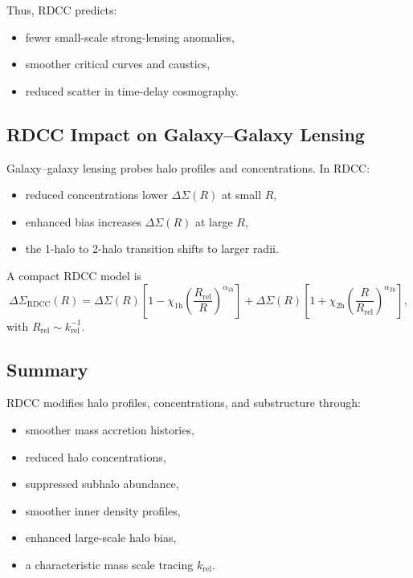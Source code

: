\documentclass[11pt,a4paper]{article}
\begin{document}
Thus, RDCC predicts:
\begin{itemize}
\item fewer small-scale strong-lensing anomalies,
\item smoother critical curves and caustics,
\item reduced scatter in time-delay cosmography.
\end{itemize}

\subsection{RDCC Impact on Galaxy–Galaxy Lensing}

Galaxy–galaxy lensing probes halo profiles and concentrations.  
In RDCC:
\begin{itemize}
\item reduced concentrations lower $\Delta\Sigma(R)$ at small $R$,
\item enhanced bias increases $\Delta\Sigma(R)$ at large $R$,
\item the 1-halo to 2-halo transition shifts to larger radii.
\end{itemize}

A compact RDCC model is
\begin{equation}
\Delta\Sigma_{\mathrm{RDCC}}(R)
=
\Delta\Sigma(R)
\left[
1
-
\chi_{1\mathrm{h}}
\left(
\frac{R_{\mathrm{rel}}}{R}
\right)^{\alpha_{1\mathrm{h}}}
\right]
+
\Delta\Sigma(R)
\left[
1
+
\chi_{2\mathrm{h}}
\left(
\frac{R}{R_{\mathrm{rel}}}
\right)^{\alpha_{2\mathrm{h}}}
\right],
\end{equation}
with $R_{\mathrm{rel}} \sim k_{\mathrm{rel}}^{-1}$.

\subsection{Summary}

RDCC modifies halo profiles, concentrations, and substructure through:
\begin{itemize}
\item smoother mass accretion histories,
\item reduced halo concentrations,
\item suppressed subhalo abundance,
\item smoother inner density profiles,
\item enhanced large-scale halo bias,
\item a characteristic mass scale tracing $k_{\mathrm{rel}}$.
\end{itemize}
\end{document}
